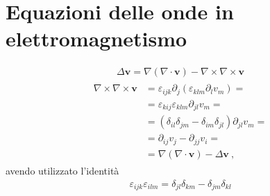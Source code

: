 \documentclass[letterpaper,10pt,italian]{jupyterBook}
\begin{document}
\section{Equazioni delle onde in elettromagnetismo}
\label{\detokenize{ch/waves-equation:equazioni-delle-onde-in-elettromagnetismo}}\label{\detokenize{ch/waves-equation:classical-electromagnetism-waves-wave-equation}}\label{\detokenize{ch/waves-equation::doc}}
\sphinxAtStartPar
{}
\begin{equation*}
\begin{split}\Delta \mathbf{v} = \nabla ( \nabla \cdot \mathbf{v} ) - \nabla \times \nabla \times \mathbf{v}\end{split}
\end{equation*}
\sphinxAtStartPar
{}
\begin{equation*}
\begin{split}\begin{aligned}
 \nabla \times \nabla \times \mathbf{v} & = \varepsilon_{ijk} \partial_j ( \varepsilon_{klm} \partial_l v_m ) = \\
 & = \varepsilon_{kij} \varepsilon_{klm} \partial_{jl} v_m = \\
 & = ( \delta_{il} \delta_{jm} - \delta_{im} \delta_{jl} )  \partial_{jl} v_m = \\
 & = \partial_{ij} v_j - \partial_{jj} v_i = \\
 & = \nabla (\nabla \cdot \mathbf{v}) - \Delta \mathbf{v} \ ,
\end{aligned}\end{split}
\end{equation*}
\sphinxAtStartPar
avendo utilizzato l’identità
\begin{equation*}
\begin{split}\varepsilon_{ijk} \varepsilon_{ilm} = \delta_{jl} \delta_{km} - \delta_{jm} \delta_{kl}\end{split}
\end{equation*}
\end{document}
